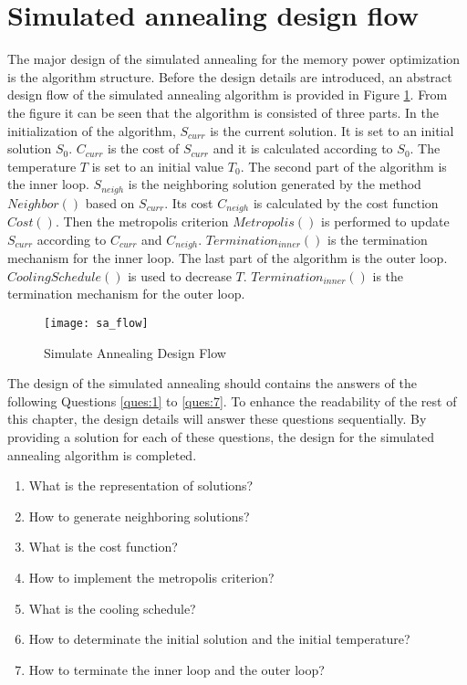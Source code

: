 	\section{Simulated annealing design flow}
	\label{sec:sa_design_flow}
	The major design of the simulated annealing for the memory power optimization is
	the algorithm structure. Before the design details are introduced, an abstract
	design flow of the simulated annealing algorithm is provided in Figure
	\ref{fig:sa_framwork}. From the figure it can be seen that the algorithm is
	consisted of three parts.
	In the initialization of the algorithm, $S_{curr}$ is
	the current solution. It is set to an initial solution $S_{0}$. $C_{curr}$ is the
	cost of $S_{curr}$ and it is calculated according to $S_{0}$. The temperature
	$T$ is set to an initial value $T_{0}$.
	The second part of the algorithm is the inner loop. $S_{neigh}$ is the neighboring
	solution generated by the method $Neighbor()$ based on $S_{curr}$. Its cost
	$C_{neigh}$ is calculated by the cost function $Cost()$. Then the metropolis
	criterion $Metropolis()$ is performed to update $S_{curr}$ according
	to $C_{curr}$ and $C_{neigh}$.
	$Termination_{inner}()$ is the termination mechanism for the inner loop.
	The last part of the algorithm is the outer loop. $CoolingSchedule()$ is used to
	decrease $T$. $Termination_{inner}()$ is the termination mechanism for the outer loop.
	\begin{figure}[htb]
		\begin{center}
			\texttt{[image: sa\_flow]}
			\caption{Simulate Annealing Design Flow}
			\label{fig:sa_framwork}
		\end{center}
	\end{figure}	

	The design of the simulated annealing should contains the answers of the following
	Questions \ref{ques:1} to \ref{ques:7}. To enhance the readability of the rest of this
	chapter, the design details will answer these questions sequentially.
	By providing a solution for each of these questions, the design for the
	simulated annealing algorithm is completed.
	\begin{enumerate} 
		\item What is the representation of solutions?
		\label{ques:1}
		\item How to generate neighboring solutions?
		\label{ques:2}
		\item What is the cost function?
		\label{ques:3}
		\item How to implement the metropolis criterion?
		\label{ques:4}
		\item What is the cooling schedule?
		\label{ques:5}
		\item How to determinate the initial solution and the initial temperature?
		\label{ques:6}
		\item How to terminate the inner loop and the outer loop?
		\label{ques:7}
	\end{enumerate}

